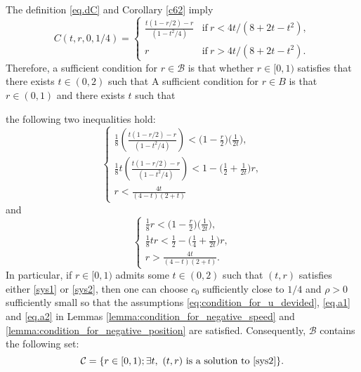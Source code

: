 \documentclass[reqno]{amsart}
\begin{document}
The definition \eqref{eq.dC} and Corollary \ref{c62} imply
	\begin{equation}
	C(t,r,0,1/4) =
	\begin{cases}
	\frac{t(1-r/2)-r }{(1-t^2/4)}
	& \mbox{if} \ r < 4t/(8+2t-t^2),\\
	r
	& \mbox{if} \ r > 4t/(8+2t-t^2).
	\end{cases}
	\end{equation}
Therefore, a sufficient condition for $r \in \mathcal B$
is that whether $r \in [0,1)$ satisfies
that there exists $t \in (0,2)$ such that
{\color{blue} A sufficient condition for 
$r\in B$
is that 
$r \in (0,1)$
and there exists $t$
such that 
}



the following two inequalities hold:
	\begin{equation}\label{sys1}
	\begin{cases}
	\frac{1}{8}  \left(\frac{t(1-r/2)-r }{(1-t^2/4)}  \right)
	< \bigg(1 - \frac{r}{2}  \bigg) \bigg( \frac{1}{2t} \bigg),\\
	\frac{1}{8} t  \left(\frac{t(1-r/2)-r }{(1-t^2/4)}  \right)
	< 1 - \bigg( \frac{1}{2} + \frac{1}{2t}\bigg) r,\\
	r
	< \frac{4t}{(4-t)(2+t)}
	\end{cases}
	\end{equation}
and
	\begin{equation}\label{sys2}
	\begin{cases}
	\frac{1}{8}  r
	< \bigg(1 - \frac{r}{2}  \bigg) \bigg( \frac{1}{2t} \bigg),\\
	\frac{1}{8} t  r
	< \frac 1 2 - \bigg( \frac{1}{4} + \frac{1}{2t}\bigg) r,\\
	r > \frac{4t}{(4-t)(2+t)}.
	\end{cases}
	\end{equation}
In particular, if $r \in [0,1)$ admits some $t \in (0,2)$
such that $(t,r)$ satisfies either \eqref{sys1} or \eqref{sys2},
then one can choose $c_0$ sufficiently close to $1/4$
and $\rho>0$ sufficiently small
so that the assumptions \eqref{eq:condition_for_u_devided}, \eqref{eq.a1} and \eqref{eq.a2}
in Lemmas \ref{lemma:condition_for_negative_speed}
and \ref{lemma:condition_for_negative_position} are satisfied.
Consequently,
$\mathcal B$ contains the following set:
	\[
	\mathcal C
	= \{r \in [0,1); \exists t, \ (t,r) \ \mbox{is a solution to \eqref{sys2}}\}.
	\]
\end{document}

